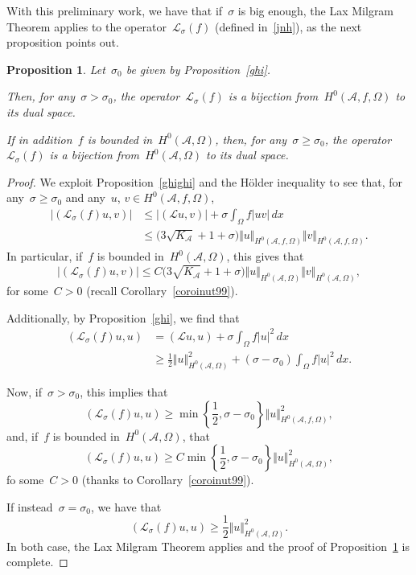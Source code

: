 \documentclass[11pt,hyp,]{nyjm}
\numberwithin{equation}{section}
\newtheorem{proposition}[theorem]{Proposition}
\theoremstyle{remark}
\newcommand{\ml}{\mathcal{L}}
\newcommand{\am}{\mathcal{A}}
\renewcommand{\leq}{\leqslant}
\renewcommand{\geq}{\geqslant}
\renewcommand{\ge}{\geqslant}
\begin{document}
With this preliminary work, we have that if~$\sigma$ is big enough, the Lax Milgram Theorem applies to the operator~$\mathcal{L}_{\sigma}(f)$ (defined in~\eqref{jnh}), as the next proposition points out. 

\begin{proposition}\label{laximi}
Let~$\sigma_0$ be given by Proposition~\ref{ghi}.

Then, for any~$\sigma > \sigma_0$,
the operator~$ \ml_{\sigma}(f)$ is a bijection from~$H^0(\am, f, \Omega)$ to its dual space.

If in addition~$f$ is bounded in~$H^0(\am, \Omega)$, then, for any~$\sigma \geq \sigma_0$, the operator~$ \ml_{\sigma}(f)$ is a bijection from~$H^0(\am, \Omega)$ to its dual space.
\end{proposition}

\begin{proof}
We exploit Proposition~\ref{ghighi} and the H\"{o}lder inequality to see that, for
any~$\sigma \geq \sigma_0$ and any~$u$, $v\in H^0(\mathcal{A},f, \Omega)$,
\begin{equation}\label{criceto}\begin{split}
|(\ml_{\sigma}(f) u, v)| &\leq |(\ml u, v)| + \sigma \int_{\Omega} f |u v| \,dx \\&\leq \big(3\sqrt{K_{\mathcal{A}}}+1+\sigma\big) \Vert u \Vert_{H^0(\mathcal{A},f, \Omega)} \Vert v \Vert_{H^0(\mathcal{A},f, \Omega)}.\end{split}
\end{equation}
In particular, if~$f$ is bounded in~$H^0(\am, \Omega)$, this gives that
$$ |(\ml_{\sigma}(f) u, v)| \leq  C\big(3\sqrt{K_{\mathcal{A}}}+1+\sigma\big) \Vert u \Vert_{H^0(\mathcal{A},\Omega)} \Vert v \Vert_{H^0(\mathcal{A},\Omega)},$$
for some~$C>0$ (recall Corollary~\ref{coroinut99}).

Additionally, by Proposition~\ref{ghi}, we find that
\begin{equation*}\begin{split}
(\ml_{\sigma}(f) u, u)& = (\ml u,u) + \sigma \int_{\Omega} f |u|^2 \, dx \\&\geq \frac12 \Vert u \Vert^2_{H^0(\mathcal{A},\Omega)} + (\sigma - \sigma_0) \int_{\Omega} f |u|^2 \, dx.\end{split}
\end{equation*}

Now, if~$\sigma>\sigma_0$, this implies that
$$ (\ml_{\sigma}(f) u, u)\ge
\min \left\{\frac12, \sigma-\sigma_0\right\} \Vert u \Vert^2_{H^0(\mathcal{A}, f, \Omega)},
$$
and, if~$f$ is bounded in~$H^0(\am, \Omega)$, that
$$ (\ml_{\sigma}(f) u, u)\ge
C\min \left\{\frac12, \sigma-\sigma_0\right\} \Vert u \Vert^2_{H^0(\mathcal{A},  \Omega)},
$$ fo some~$C>0$ (thanks to Corollary~\ref{coroinut99}).

If instead~$\sigma=\sigma_0$, we have that
$$  (\ml_{\sigma}(f) u, u)\ge\frac12 \Vert u \Vert^2_{H^0(\mathcal{A}, \Omega)}.$$
In both case, the Lax Milgram Theorem applies and the proof of Proposition~\ref{laximi} is complete.
\end{proof}
			
\end{document}
